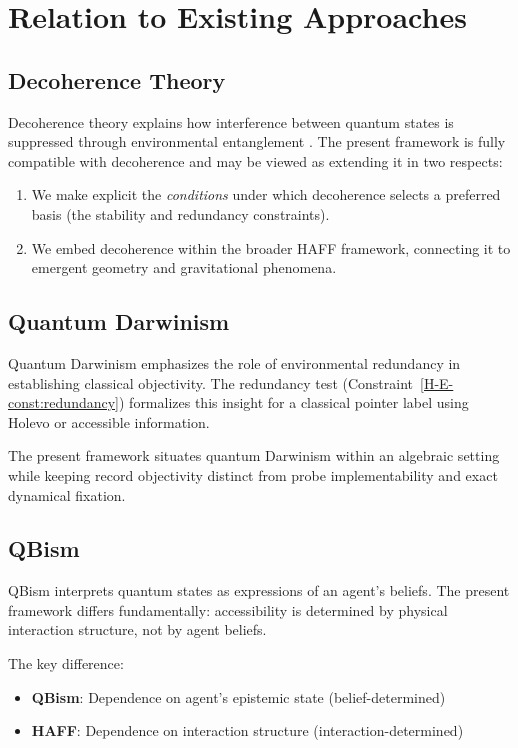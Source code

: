 \documentclass[12pt,a4paper,openany]{book}
\begin{document}
\section{Relation to Existing Approaches}
\label{H-E-sec:relations}

\subsection{Decoherence Theory}

Decoherence theory explains how interference between quantum states is suppressed through environmental entanglement \cite{Zurek2003}. The present framework is fully compatible with decoherence and may be viewed as extending it in two respects:

\begin{enumerate}
    \item We make explicit the \emph{conditions} under which decoherence selects a preferred basis (the stability and redundancy constraints).
    \item We embed decoherence within the broader HAFF framework, connecting it to emergent geometry and gravitational phenomena.
\end{enumerate}

\subsection{Quantum Darwinism}

Quantum Darwinism \cite{Zurek2009} emphasizes the role of environmental redundancy in establishing classical objectivity. The redundancy test (Constraint~\ref{H-E-const:redundancy}) formalizes this insight for a classical pointer label using Holevo or accessible information.

The present framework situates quantum Darwinism within an algebraic setting while keeping record objectivity distinct from probe implementability and exact dynamical fixation.

\subsection{QBism}

QBism \cite{Fuchs2014} interprets quantum states as expressions of an agent's beliefs. The present framework differs fundamentally: accessibility is determined by physical interaction structure, not by agent beliefs.

The key difference:
\begin{itemize}
    \item \textbf{QBism}: Dependence on agent's epistemic state (belief-determined)
    \item \textbf{HAFF}: Dependence on interaction structure (interaction-determined)
\end{itemize}
\end{document}
